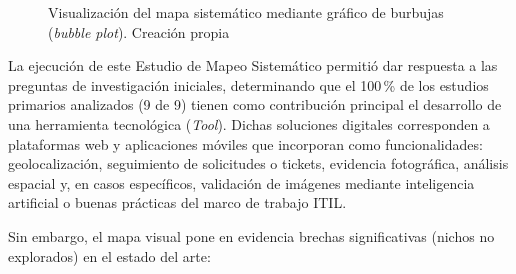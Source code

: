 \begin{figure}[htbp]
	\caption{Visualización del mapa sistemático mediante gráfico de burbujas (\textit{bubble plot}). Creación propia}
	\label{fig:bubble_plot}
\end{figure}

La ejecución de este Estudio de Mapeo Sistemático permitió dar respuesta a las preguntas de investigación iniciales, determinando que el 100\,\% de los estudios primarios analizados (9 de 9) tienen como contribución principal el desarrollo de una herramienta tecnológica (\textit{Tool}). Dichas soluciones digitales corresponden a plataformas web y aplicaciones móviles que incorporan como funcionalidades: geolocalización, seguimiento de solicitudes o tickets, evidencia fotográfica, análisis espacial y, en casos específicos, validación de imágenes mediante inteligencia artificial o buenas prácticas del marco de trabajo ITIL.

Sin embargo, el mapa visual pone en evidencia brechas significativas (nichos no explorados) en el estado del arte:

